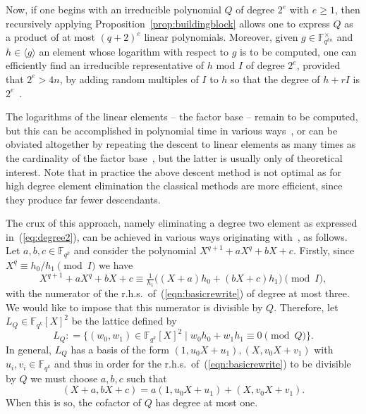 \documentclass[11pt]{llncs}
\newcommand{\F}{\mathbb F}
\newcommand{\defeq}{\mathrel{\mathop:}=}
\begin{document}
Now, if one begins with an irreducible polynomial $Q$ of degree $2^e$ with $e \ge 1$, then recursively applying Proposition~\ref{prop:buildingblock} allows
one to express $Q$ as a product of at most $(q+2)^e$ linear polynomials. Moreover, given $g \in \F_{q^{kn}}^{\times}$ and $h \in \langle g \rangle$ 
an element whose logarithm with respect to $g$ is to be computed, one can efficiently find an irreducible representative of $h$ mod $I$ of degree 
$2^e$, provided that $2^e > 4n$, by adding random multiples of $I$ to $h$ so that the degree of $h + rI$ is $2^e$~\cite[Lem.~3.3]{GKZ18}.

The logarithms of the linear elements -- the factor base -- remain to be computed, but this can be accomplished in polynomial time in various 
ways~\cite{GGMZ13a,Joux13b}, or can be obviated altogether by repeating the descent to linear elements as many times as the cardinality of the factor 
base~\cite{EngeGaudry}, but the latter is usually only of theoretical interest. Note that in practice the above descent method is not optimal as for 
high degree element elimination the classical methods are more efficient, since they produce far fewer descendants.

The crux of this approach, namely eliminating a degree two element as expressed in~(\ref{eq:degree2}), can be achieved in various ways originating 
with~\cite{GGMZ13a}, as follows. Let $a, b, c \in \F_{q^k}$ and consider the polynomial $X^{q+1} + a X^q + b X + c$.
Firstly, since $X^q \equiv h_0/h_1 \pmod I$ we have
\begin{equation}\label{eqn:basicrewrite}
X^{q+1} + a X^q + b X + c \equiv \tfrac 1 {h_1} \big( (X + a) h_0 + (b X + c) h_1 \big) \!\pmod I,
\end{equation}
with the numerator of the r.h.s.\ of~(\ref{eqn:basicrewrite}) of degree at most three. We would like to impose that this numerator is divisible by $Q$. Therefore, let $L_Q \in \F_{q^k}[X]^2$ be the lattice defined by
\[ L_Q \defeq \{( w_0, w_1) \in \F_{q^k}[X]^2 \mid w_0 h_0 + w_1 h_1 \equiv 0 \!\!\pmod{Q} \} . \]
In general, $L_Q$ has a basis of the form $(1,u_0X + u_1), (X,v_0X +v_1)$ with $u_i,v_i \in \F_{q^k}$ and thus in order for the r.h.s.\
of~(\ref{eqn:basicrewrite}) to be divisible by $Q$ we must choose $a,b,c$ such that 
\begin{equation}\label{eqn:abc}
(X + a, b X + c) = a (1, u_0 X + u_1) + (X, v_0 X + v_1) .
\end{equation}
When this is so, the cofactor of $Q$ has degree at most one.
\end{document}
